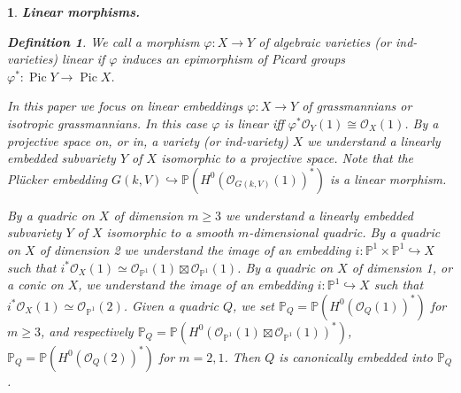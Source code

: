 \documentclass[12pt]{amsart}
\newcommand{\Pic}{\operatorname{Pic}\nolimits}
\renewcommand{\phi}{\varphi}
\newtheorem{sub}[subsection]{}
\theoremstyle{definition}
\newtheorem{definition}[theorem]{Definition}
\begin{document}
\begin{sub}{\bf Linear morphisms.}\label{subsection 2.2}
\rm

\begin{definition}\label{lin mor}
We call a morphism $\phi: X\to Y$ of algebraic varieties (or ind-varieties) \textit{linear} if $\phi$ induces an
epimorphism of Picard groups $\phi^*:\Pic Y\to\Pic X$.
\end{definition}

In this paper we focus on linear embeddings $\phi: X\to Y$ of grassmannians or isotropic grassmannians. In this case
$\phi$ is linear iff $\phi^*\mathcal{O}_Y(1)\cong\mathcal{O}_X(1)$.
By a \textit{projective space on}, or \textit{in}, a variety (or ind-variety) $X$ we
understand a linearly embedded subvariety $Y$ of $X$ isomorphic to a projective space.
Note that the Pl\"ucker embedding $G(k,V)\hookrightarrow\mathbb{P}(H^0(\mathcal{O}_{G(k,V)}(1))^*)$ is a linear
morphism.

By a \textit{quadric on} $X$ of dimension $m\ge3$ we understand a linearly embedded subvariety
$Y$ of $X$ isomorphic to a smooth $m$-dimensional quadric. By a quadric on $X$ of dimension 2
we understand the image of an embedding
$i:\mathbb{P}^1\times\mathbb{P}^1\hookrightarrow X$ such that $i^*\mathcal{O}_X(1)\simeq
\mathcal{O}_{\mathbb{P}^1}(1)\boxtimes\mathcal{O}_{\mathbb{P}^1}(1)$.
By a quadric on $X$ of dimension 1, or a \textit{conic} on $X$,
we understand the image of an embedding $i:\mathbb{P}^1\hookrightarrow X$ such that
$i^*\mathcal{O}_X(1)\simeq\mathcal{O}_{\mathbb{P}^1}(2)$. Given a quadric $Q$, we set $\mathbb{P}_Q=\mathbb{P}
(H^0(\mathcal{O}_Q(1))^*)$ for $m\ge3$, and respectively
$\mathbb{P}_Q=\mathbb{P}(H^0(\mathcal{O}_{\mathbb{P}^1}(1)\boxtimes\mathcal{O}_{\mathbb{P}^1}(1))^*)$,
$\mathbb{P}_Q=\mathbb{P}(H^0(\mathcal{O}_{Q}(2))^*)$ for $m=2,1$. Then $Q$ is canonically embedded into $\mathbb{P}_Q$.
\end{sub}
\end{document}
